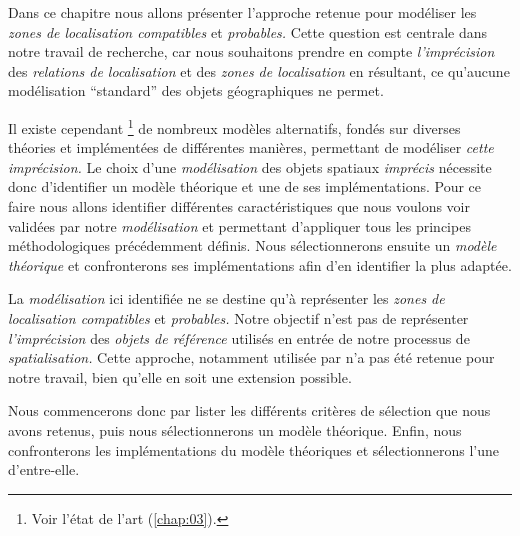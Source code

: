 Dans ce chapitre nous allons présenter l'approche retenue pour
modéliser les \emph{zones de localisation compatibles} et
\emph{probables.} Cette question est centrale dans notre travail de
recherche, car nous souhaitons prendre en compte \emph{l'imprécision}
des \emph{relations de localisation} et des \emph{zones de
  localisation} en résultant, ce qu'aucune modélisation
\enquote{standard} des objets géographiques ne permet.

Il existe cependant \footnote{Voir l'état de l'art
  (\autoref{chap:03}).} de nombreux modèles alternatifs, fondés sur
diverses théories et implémentées de différentes manières, permettant
de modéliser \emph{cette imprécision.} Le choix d'une
\emph{modélisation} des objets spatiaux \emph{imprécis} nécessite donc
d'identifier un modèle théorique et une de ses implémentations. Pour
ce faire nous allons identifier différentes caractéristiques que nous
voulons voir validées par notre \emph{modélisation} et permettant
d'appliquer tous les principes méthodologiques précédemment
définis. Nous sélectionnerons ensuite un \emph{modèle théorique} et
confronterons ses implémentations afin d'en identifier la plus
adaptée.

La \emph{modélisation} ici identifiée ne se destine qu'à représenter
les \emph{zones de localisation compatibles} et \emph{probables.}
Notre objectif n'est pas de représenter \emph{l'imprécision} des
\emph{objets de référence} utilisés en entrée de notre processus de
\emph{spatialisation.} Cette approche, notamment utilisée par
\textcite{Bloch1996} n'a pas été retenue pour notre travail, bien
qu'elle en soit une extension possible.

Nous commencerons donc par lister les différents critères de sélection
que nous avons retenus, puis nous sélectionnerons un modèle
théorique. Enfin, nous confronterons les implémentations du modèle
théoriques et sélectionnerons l'une d'entre-elle.

